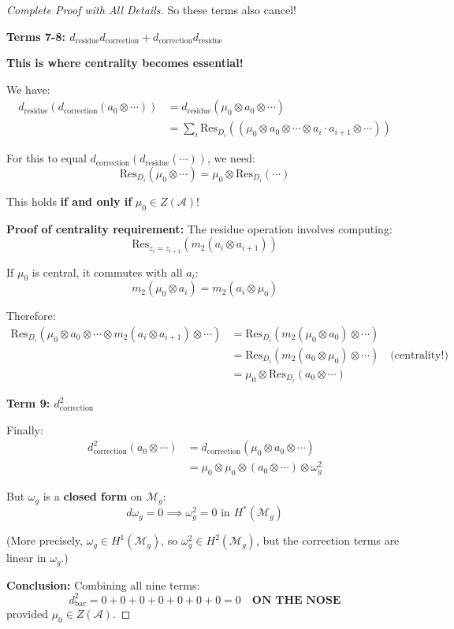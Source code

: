 \begin{proof}[Complete Proof with All Details]
So these terms also cancel!

\textbf{Terms 7-8: $d_{\text{residue}} d_{\text{correction}} + d_{\text{correction}} 
d_{\text{residue}}$}

\textbf{This is where centrality becomes essential!}

We have:
\begin{align}
d_{\text{residue}}(d_{\text{correction}}(a_0 \otimes \cdots)) 
&= d_{\text{residue}}(\mu_0 \otimes a_0 \otimes \cdots) \\
&= \sum_i \text{Res}_{D_i}((\mu_0 \otimes a_0 \otimes \cdots \otimes a_i \cdot a_{i+1} 
\otimes \cdots))
\end{align}

For this to equal $d_{\text{correction}}(d_{\text{residue}}(\cdots))$, we need:
\begin{equation}
\text{Res}_{D_i}(\mu_0 \otimes \cdots) = \mu_0 \otimes \text{Res}_{D_i}(\cdots)
\end{equation}

This holds \textbf{if and only if} $\mu_0 \in Z(\mathcal{A})$!

\textbf{Proof of centrality requirement:}
The residue operation involves computing:
$$\text{Res}_{z_i = z_{i+1}}(m_2(a_i \otimes a_{i+1}))$$

If $\mu_0$ is central, it commutes with all $a_i$:
$$m_2(\mu_0 \otimes a_i) = m_2(a_i \otimes \mu_0)$$

Therefore:
\begin{align}
\text{Res}_{D_i}(\mu_0 \otimes a_0 \otimes \cdots \otimes m_2(a_i \otimes a_{i+1}) \otimes \cdots) 
&= \text{Res}_{D_i}(m_2(\mu_0 \otimes a_0) \otimes \cdots) \\
&= \text{Res}_{D_i}(m_2(a_0 \otimes \mu_0) \otimes \cdots) \quad \text{(centrality!)} \\
&= \mu_0 \otimes \text{Res}_{D_i}(a_0 \otimes \cdots)
\end{align}

\textbf{Term 9: $d_{\text{correction}}^2$}

Finally:
\begin{align}
d_{\text{correction}}^2(a_0 \otimes \cdots) 
&= d_{\text{correction}}(\mu_0 \otimes a_0 \otimes \cdots) \\
&= \mu_0 \otimes \mu_0 \otimes (a_0 \otimes \cdots) \otimes \omega_g^2
\end{align}

But $\omega_g$ is a \textbf{closed form} on $\mathcal{M}_g$:
$$d\omega_g = 0 \implies \omega_g^2 = 0 \text{ in } H^*(\mathcal{M}_g)$$

(More precisely, $\omega_g \in H^1(\mathcal{M}_g)$, so $\omega_g^2 \in H^2(\mathcal{M}_g)$, 
but the correction terms are linear in $\omega_g$.)

\textbf{Conclusion:} Combining all nine terms:
\begin{equation}
d_{\text{bar}}^2 = 0 + 0 + 0 + 0 + 0 + 0 + 0 = 0 \quad \textbf{ON THE NOSE}
\end{equation}
provided $\mu_0 \in Z(\mathcal{A})$.

\end{proof}

